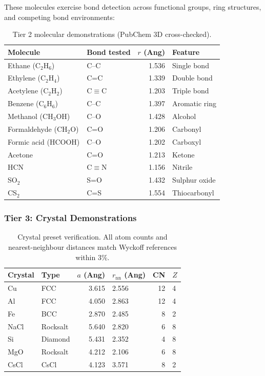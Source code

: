 \documentclass[11pt,twoside]{article}
\def\AA{Ang}%
\begin{document}
These molecules exercise bond detection across functional groups, ring structures, and competing bond environments:

\begin{table}[H]
\centering
\caption{Tier 2 molecular demonstrations (PubChem 3D cross-checked).}
\label{tab:tier2}
\begin{tabular}{llrl}
\toprule
\textbf{Molecule} & \textbf{Bond tested} & \textbf{$r$ (\AA)} & \textbf{Feature} \\
\midrule
Ethane (C$_2$H$_6$) & C--C & 1.536 & Single bond \\
Ethylene (C$_2$H$_4$) & C=C & 1.339 & Double bond \\
Acetylene (C$_2$H$_2$) & C$\equiv$C & 1.203 & Triple bond \\
Benzene (C$_6$H$_6$) & C--C & 1.397 & Aromatic ring \\
Methanol (CH$_3$OH) & C--O & 1.428 & Alcohol \\
Formaldehyde (CH$_2$O) & C=O & 1.206 & Carbonyl \\
Formic acid (HCOOH) & C--O & 1.202 & Carboxyl \\
Acetone & C=O & 1.213 & Ketone \\
HCN & C$\equiv$N & 1.156 & Nitrile \\
SO$_2$ & S=O & 1.432 & Sulphur oxide \\
CS$_2$ & C=S & 1.554 & Thiocarbonyl \\
\bottomrule
\end{tabular}
\end{table}

\subsubsection{Tier 3: Crystal Demonstrations}

\begin{table}[H]
\centering
\caption{Crystal preset verification. All atom counts and nearest-neighbour distances match Wyckoff references within 3\%.}
\label{tab:crystals}
\begin{tabular}{llrlrl}
\toprule
\textbf{Crystal} & \textbf{Type} & \textbf{$a$ (\AA)} & \textbf{$r_{\mathrm{nn}}$ (\AA)} & \textbf{CN} & \textbf{$Z$} \\
\midrule
Cu  & FCC      & 3.615 & 2.556 & 12 & 4 \\
Al  & FCC      & 4.050 & 2.863 & 12 & 4 \\
Fe  & BCC      & 2.870 & 2.485 & 8  & 2 \\
NaCl & Rocksalt & 5.640 & 2.820 & 6  & 8 \\
Si  & Diamond  & 5.431 & 2.352 & 4  & 8 \\
MgO & Rocksalt & 4.212 & 2.106 & 6  & 8 \\
CsCl & CsCl    & 4.123 & 3.571 & 8  & 2 \\
\bottomrule
\end{tabular}
\end{table}
\end{document}
